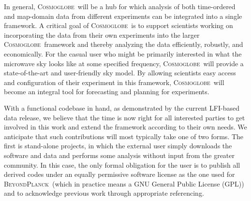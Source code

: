 \documentclass[twocolumn]{openjournal}
\def\commander{\texttt{Commander}}
\newcommand{\BP}{\textsc{BeyondPlanck}}
\newcommand{\cosmoglobe}{\textsc{Cosmoglobe}}
\newcommand{\btoc}{\textsc{bits2cosmology}}
\begin{document}

In general, \cosmoglobe\ will be a hub for which analysis of both time-ordered
and map-domain data from different experiments can be integrated into a single
framework. A critical goal of \cosmoglobe\ is to support scientists working on
incorporating the data from their own experiments into the larger \cosmoglobe\
framework and thereby analyzing the data efficiently, robustly, and
economically. For the casual user who might be primarily interested in what the
microwave sky looks like at some specified frequency, \cosmoglobe\ will provide
a state-of-the-art and user-friendly sky model. By allowing scientists easy
access and configuration of their experiment in this framework, \cosmoglobe\
will become an integral tool for forecasting and planning for experiments.

With a functional codebase in hand, as demonstrated by the current LFI-based
data release, we believe that the time is now right for all interested parties
to get involved in this work and extend the framework according to their own
needs. We anticipate that such contributions will most typically take one of
two forms. The first is stand-alone projects, in which the external user simply
downloads the software and data and performs some analysis without input from
the greater community. In this case, the only formal obligation for the user is
to publish all derived codes under an equally permissive software license as
the one used for \BP\ (which in practice means a GNU General Public License
(GPL)) and to acknowledge previous work through appropriate referencing.
\end{document}
